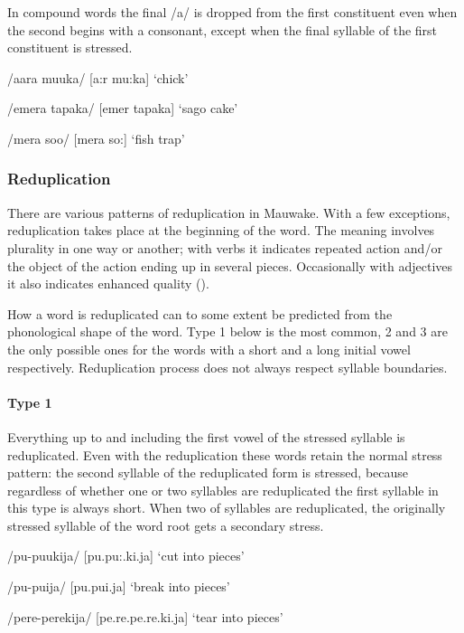 In compound words the final /a/ is dropped from the first constituent even when the second begins with a consonant, except when the final syllable of the first constituent is stressed.  

/aara muuka/  [{{\textprimstress}a:r {{\textprimstress}}mu:ka}]  `chick'

/emera tapaka/  [e{{\textprimstress}mer ta{{\textprimstress}}paka}]  `sago cake'

/mera soo/  [me{{\textprimstress}ra {{\textprimstress}}so:}]  `fish trap'

\subsubsection{Reduplication}

There are various patterns of reduplication in Mauwake. With a few exceptions, reduplication takes place at the beginning of the word.  The meaning involves plurality in one way or another; with verbs it indicates repeated action and/or the object of the action ending up in several pieces. Occasionally with adjectives it also indicates enhanced quality ().

How a word is reduplicated can to some extent be predicted from the phonological shape of the word.  Type 1 below is the most common, 2 and 3 are the only possible ones for the words with a short and a long initial vowel respectively.  Reduplication process does not always respect syllable boundaries.

\paragraph[Type 1]{Type 1}

Everything up to and including the first vowel of the stressed syllable is reduplicated.  Even with the reduplication these words retain the normal stress pattern: the second syllable of the reduplicated form is stressed, because regardless of whether one or two syllables are reduplicated the first syllable in this type is always short. When two of syllables are reduplicated, the originally stressed syllable of the word root gets a secondary stress.

/pu-puukija/  [pu.{{\textprimstress}pu:.ki.ja}]  `cut into pieces'

/pu-puija/  [pu.{{\textprimstress}pui.ja}]  `break into pieces'

/pere-perekija/  [pe.{{\textprimstress}}re.pe.{{\textprimstress}}{{\textprimstress}}re.ki.ja]  `tear into pieces'

